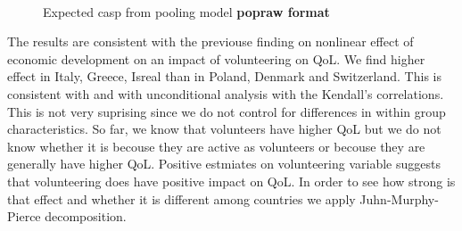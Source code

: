 \documentclass[10pt, letterpaper]{article}
\begin{document}
\begin{spacing}{1.4}
\begin{figure}[H]
\centering
\caption{Expected casp from pooling model \textbf{popraw format}} 
\label{fig:pooling1}
\begin{minipage}{1\linewidth}
\quad
{}~\\

\end{minipage}
\end{figure}


The results are consistent with the previouse finding on nonlinear effect of economic development on an impact of volunteering on QoL. We find higher effect in Italy, Greece, Isreal than in Poland, Denmark and Switzerland. This  is consistent with \citet{haski09} and with unconditional analysis with the Kendall's correlations. This is not very suprising since we do not control for differences in within group characteristics. So far, we know that volunteers have higher QoL but we do not know whether it is becouse they are active as volunteers or becouse they are generally have higher QoL. Positive estmiates on volunteering variable suggests that volunteering does have positive impact on QoL. In order to see how strong is that effect and whether it is different among countries we apply Juhn-Murphy-Pierce decomposition. 


\end{spacing}
\end{document}
